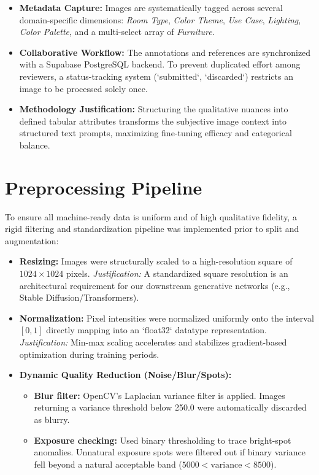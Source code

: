 \documentclass[11pt, a4paper]{article}
\begin{document}
\begin{itemize}
    \item \textbf{Metadata Capture:} Images are systematically tagged across several domain-specific dimensions: \textit{Room Type}, \textit{Color Theme}, \textit{Use Case}, \textit{Lighting}, \textit{Color Palette}, and a multi-select array of \textit{Furniture}.
    \item \textbf{Collaborative Workflow:} The annotations and references are synchronized with a Supabase PostgreSQL backend. To prevent duplicated effort among reviewers, a status-tracking system (`submitted`, `discarded`) restricts an image to be processed solely once.
    \item \textbf{Methodology Justification:} Structuring the qualitative nuances into defined tabular attributes transforms the subjective image context into structured text prompts, maximizing fine-tuning efficacy and categorical balance. 
\end{itemize}

\section{Preprocessing Pipeline}
To ensure all machine-ready data is uniform and of high qualitative fidelity, a rigid filtering and standardization pipeline was implemented prior to split and augmentation:

\begin{itemize}
    \item \textbf{Resizing:} Images were structurally scaled to a high-resolution square of $1024 \times 1024$ pixels. 
    \textit{Justification:} A standardized square resolution is an architectural requirement for our downstream generative networks (e.g., Stable Diffusion/Transformers).
    \item \textbf{Normalization:} Pixel intensities were normalized uniformly onto the interval $[0, 1]$ directly mapping into an `float32` datatype representation. 
    \textit{Justification:} Min-max scaling accelerates and stabilizes gradient-based optimization during training periods.
    \item \textbf{Dynamic Quality Reduction (Noise/Blur/Spots):}
        \begin{itemize}
            \item \textbf{Blur filter:} OpenCV's Laplacian variance filter is applied. Images returning a variance threshold below 250.0 were automatically discarded as blurry.
            \item \textbf{Exposure checking:} Used binary thresholding to trace bright-spot anomalies. Unnatural exposure spots were filtered out if binary variance fell beyond a natural acceptable band ($5000 < \text{variance} < 8500$). 
        \end{itemize}
\end{itemize}
\end{document}
